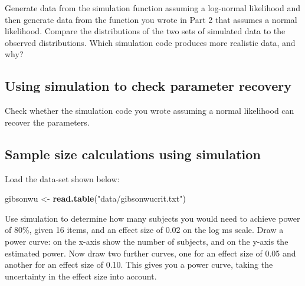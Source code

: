 \documentclass[12pt,]{krantz}
\newenvironment{Shaded}{\begin{snugshade}}{\end{snugshade}}
\newcommand{\KeywordTok}[1]{\textcolor[rgb]{0.13,0.29,0.53}{\textbf{#1}}}
\newcommand{\NormalTok}[1]{#1}
\newcommand{\StringTok}[1]{\textcolor[rgb]{0.31,0.60,0.02}{#1}}
\begin{document}
Generate data from the simulation function assuming a log-normal likelihood and then generate data from the function you wrote in Part 2 that assumes a normal likelihood. Compare the distributions of the two sets of simulated data to the observed distributions. Which simulation code produces more realistic data, and why?

\hypertarget{sec:SimulationexercisesPart4}{%
\subsection{Using simulation to check parameter recovery}\label{sec:SimulationexercisesPart4}}

Check whether the simulation code you wrote assuming a normal likelihood can recover the parameters.

\hypertarget{sec:SimulationexercisesPart5}{%
\subsection{Sample size calculations using simulation}\label{sec:SimulationexercisesPart5}}

Load the data-set shown below:

\begin{Shaded}
\begin{Highlighting}[]
\NormalTok{gibsonwu <-}\StringTok{ }\KeywordTok{read.table}\NormalTok{(}\StringTok{"data/gibsonwucrit.txt"}\NormalTok{)}
\end{Highlighting}
\end{Shaded}

Use simulation to determine how many subjects you would need to achieve power of 80\%, given 16 items, and an effect size of 0.02 on the log ms scale. Draw a power curve: on the x-axis show the number of subjects, and on the y-axis the estimated power. Now draw two further curves, one for an effect size of 0.05 and another for an effect size of 0.10. This gives you a power curve, taking the uncertainty in the effect size into account.



\backmatter
\printindex
\end{document}
